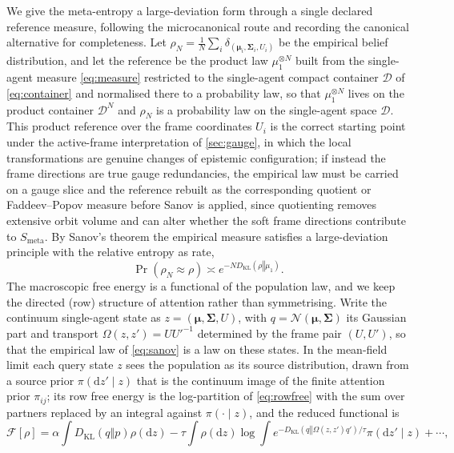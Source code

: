 \documentclass[11pt]{article}
\theoremstyle{plain}
\theoremstyle{definition}
\newcommand{\KL}[2]{D_{\mathrm{KL}}\mathopen{}\left(#1 \mathbin{\Vert} #2\right)\mathclose{}}
\newcommand{\dd}{\mathrm{d}}
\newcommand{\bmu}{\boldsymbol{\mu}}
\newcommand{\bSigma}{\boldsymbol{\Sigma}}
\newcommand{\Fcal}{\mathcal{F}}
\newcommand{\Dcal}{\mathcal{D}}
\newcommand{\Ncal}{\mathcal{N}}
\newcommand{\Smeta}{S_{\mathrm{meta}}}
\begin{document}
We give the meta-entropy a large-deviation form through a single declared reference
measure, following the microcanonical route and recording the canonical alternative for
completeness. Let $\rho_N=\tfrac1N\sum_i\delta_{(\bmu_i,\bSigma_i,U_i)}$ be the empirical
belief distribution, and let the reference be the product law $\mu_1^{\otimes N}$ built
from the single-agent measure \cref{eq:measure} restricted to the single-agent compact
container $\Dcal$ of \cref{eq:container} and normalised there to a probability law, so
that $\mu_1^{\otimes N}$ lives on the product container $\Dcal^{N}$ and $\rho_N$ is a
probability law on the single-agent space $\Dcal$. This product reference over the frame
coordinates $U_i$ is the correct starting point under the active-frame interpretation of
\cref{sec:gauge}, in which the local transformations are genuine changes of epistemic
configuration; if instead the frame directions are true gauge redundancies, the empirical law
must be carried on a gauge slice and the reference rebuilt as the corresponding quotient or
Faddeev--Popov measure \citep{faddeev1967feynman} before Sanov is applied, since quotienting
removes extensive orbit volume and can alter whether the soft frame directions contribute to
$\Smeta$. By Sanov's
theorem the empirical measure satisfies a large-deviation principle with the relative
entropy as rate,
\begin{equation}
\label{eq:sanov}
\Pr(\rho_N\approx\rho)\asymp e^{-N\KL{\rho}{\mu_1}}.
\end{equation}
The macroscopic free energy is a functional of the population law, and we keep the
directed (row) structure of attention rather than symmetrising. Write the continuum
single-agent state as $z=(\bmu,\bSigma,U)$, with $q=\Ncal(\bmu,\bSigma)$ its Gaussian
part and transport $\Omega(z,z')=U U'^{-1}$ determined by the frame pair $(U,U')$, so that
the empirical law of \cref{eq:sanov} is a law on these states. In the mean-field limit
each query state $z$ sees the population as its source distribution, drawn from a source
prior $\pi(\dd z'\mid z)$ that is the continuum image of the finite attention prior
$\pi_{ij}$; its row free energy is the log-partition of \cref{eq:rowfree} with the sum
over partners replaced by an integral against $\pi(\cdot\mid z)$, and the reduced functional is
\begin{equation}
\label{eq:Frho}
\Fcal[\rho]=\alpha\int \KL{q}{p}\rho(\dd z)
-\tau\int \rho(\dd z)\log\int e^{-\KL{q}{\Omega(z,z') q'}/\tau}\pi(\dd z'\mid z)+\cdots,
\end{equation}
\end{document}
